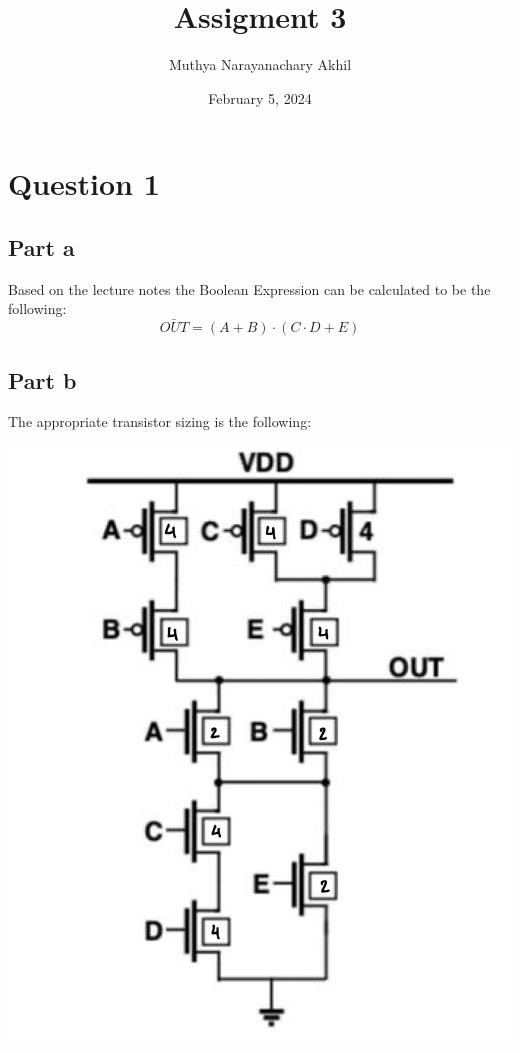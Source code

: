 \documentclass{article}
\title{Assigment 3}
\author{Muthya Narayanachary Akhil}
\date{February 5, 2024}
\begin{document}
\maketitle

\section*{Question 1}
\subsection*{Part a}

Based on the lecture notes the Boolean Expression can be calculated to be the following:
\begin{equation}
    \bar{OUT} = (A + B) \cdot (C \cdot D + E)
\end{equation}

\subsection*{Part b}
The appropriate transistor sizing is the following:

\includegraphics[scale = 0.5]{transistorsizing.png}
\end{document}
